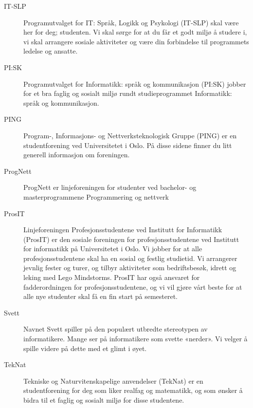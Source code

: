 \begin{description}
	\item [IT-SLP] Programutvalget for IT: Språk, Logikk og Psykologi (IT-SLP) skal være her for deg; studenten. Vi skal sørge for at du får et godt miljø å studere i, vi skal arrangere sosiale aktiviteter og være din forbindelse til programmets ledelse og ansatte.
	\item [PI:SK] Programutvalget for Informatikk: språk og kommunikasjon (PI:SK) jobber for et bra faglig og sosialt miljø rundt studieprogrammet Informatikk: språk og kommunikasjon.
	\item [PING] Program-, Informasjons- og Nettverksteknologisk Gruppe (PING) er en studentforening ved Universitetet i Oslo. På disse sidene finner du litt generell informasjon om foreningen.
	\item [ProgNett] ProgNett er linjeforeningen for studenter ved bachelor- og masterprogrammene Programmering og nettverk
	\item [ProsIT] Linjeforeningen Profesjonsstudentene ved Institutt for Informatikk (ProsIT) er den sosiale foreningen for profesjonsstudentene ved Institutt for informatikk på Universitetet i Oslo. Vi jobber for at alle profesjonsstudentene skal ha en sosial og festlig studietid. Vi arrangerer jevnlig fester og turer, og tilbyr aktiviteter som bedriftsbesøk, idrett og leking med Lego Mindstorms. ProsIT har også ansvaret for fadderordningen for profesjonsstudentene, og vi vil gjøre vårt beste for at alle nye studenter skal få en fin start på semesteret.
	\item [Svett] Navnet Svett spiller på den populært utbredte stereotypen av informatikere. Mange ser på informatikere som svette «nerder». Vi velger å spille videre på dette med et glimt i øyet.
	\item [TekNat] Tekniske og Naturvitenskapelige anvendelser (TekNat) er en studentforening for deg som liker realfag og matematikk, og som ønsker å bidra til et faglig og sosialt miljø for disse studentene.
\end{description}
